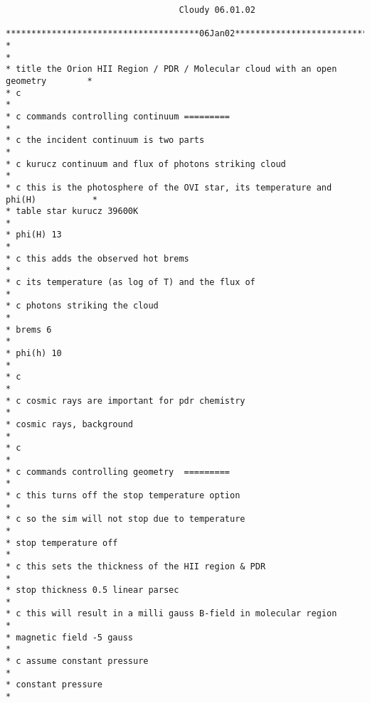 {\setverbatimfontsize{\tiny}
\begin{verbatim}
                                  Cloudy 06.01.02

**************************************06Jan02**************************************
*                                                                                 *
* title the Orion HII Region / PDR / Molecular cloud with an open geometry        *
* c                                                                               *
* c commands controlling continuum =========                                      *
* c the incident continuum is two parts                                           *
* c kurucz continuum and flux of photons striking cloud                           *
* c this is the photosphere of the OVI star, its temperature and phi(H)           *
* table star kurucz 39600K                                                        *
* phi(H) 13                                                                       *
* c this adds the observed hot brems                                              *
* c its temperature (as log of T) and the flux of                                 *
* c photons striking the cloud                                                    *
* brems 6                                                                         *
* phi(h) 10                                                                       *
* c                                                                               *
* c cosmic rays are important for pdr chemistry                                   *
* cosmic rays, background                                                         *
* c                                                                               *
* c commands controlling geometry  =========                                      *
* c this turns off the stop temperature option                                    *
* c so the sim will not stop due to temperature                                   *
* stop temperature off                                                            *
* c this sets the thickness of the HII region & PDR                               *
* stop thickness 0.5 linear parsec                                                *
* c this will result in a milli gauss B-field in molecular region                 *
* magnetic field -5 gauss                                                         *
* c assume constant pressure                                                      *
* constant pressure                                                               *

\end{verbatim}}
